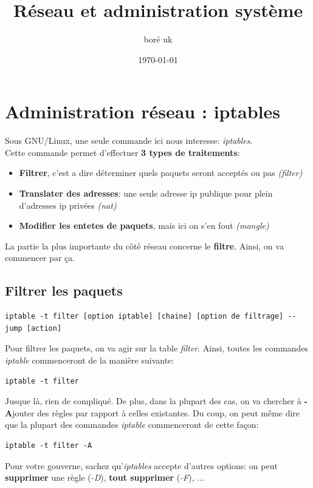 \documentclass{article}
\title{Réseau et administration système}
\author{boré uk}
\date{\today}
\begin{document}
\maketitle{}

\section{Administration réseau : iptables}
Sous GNU/Linux, une seule commande ici nous interesse: \emph{iptables}.\\
Cette commande permet d'effectuer \textbf{3 types de traitements}:
\begin{itemize}
\item{\textbf{Filtrer}, c'est a dire déterminer quels paquets seront acceptés ou pas \emph{(filter)}}
\item{\textbf{Translater des adresses}: une seule adresse ip publique pour plein d'adresses ip privées \emph{(nat)}}
\item{\textbf{Modifier les entetes de paquets}, mais ici on s'en fout \emph{(mangle)}}
\end{itemize}

La partie la plus importante du côté réseau concerne le \textbf{filtre}. Ainsi, on va commencer par ça.

\subsection{Filtrer les paquets}
\begin{center}
\begin{verbatim}
iptable -t filter [option iptable] [chaine] [option de filtrage] --jump [action]
\end{verbatim}
\end{center}

Pour filtrer les paquets, on va agir sur la table \emph{filter}. Ainsi, toutes les commandes \emph{iptable} commenceront de la manière suivante:
\begin{verbatim}
iptable -t filter
\end{verbatim}
Jusque là, rien de compliqué. De plus, dans la plupart des cas, on va chercher à \textbf{-A}jouter des règles par rapport à celles existantes. Du coup, on peut même dire que la plupart des commandes \emph{iptable} commenceront de cette façon:
\begin{verbatim}
iptable -t filter -A
\end{verbatim}
Pour votre gouverne, sachez qu'\emph{iptables} accepte d'autres options: on peut \textbf{supprimer} une règle (\emph{-D}), \textbf{tout supprimer} (\emph{-F}), ...
\end{document}
